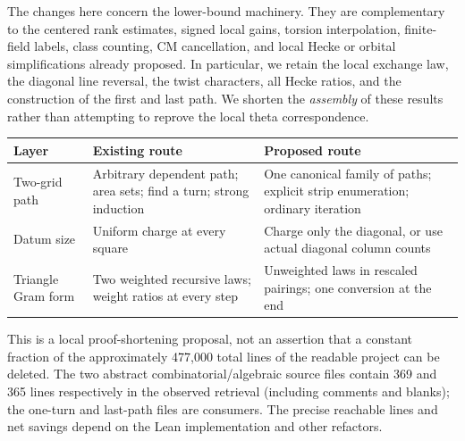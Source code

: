 \documentclass[11pt]{article}
\begin{document}
The changes here concern the lower-bound machinery. They are complementary to the centered rank estimates, signed local gains, torsion interpolation, finite-field labels, class counting, CM cancellation, and local Hecke or orbital simplifications already proposed. In particular, we retain the local exchange law, the diagonal line reversal, the twist characters, all Hecke ratios, and the construction of the first and last path. We shorten the \emph{assembly} of these results rather than attempting to reprove the local theta correspondence.

\begin{center}
\begin{tabular}{p{.25\linewidth}p{.33\linewidth}p{.32\linewidth}}
\toprule
Layer & Existing route & Proposed route\\\midrule
Two-grid path & Arbitrary dependent path; area sets; find a turn; strong induction & One canonical family of paths; explicit strip enumeration; ordinary iteration\\
Datum size & Uniform charge at every square & Charge only the diagonal, or use actual diagonal column counts\\
Triangle Gram form & Two weighted recursive laws; weight ratios at every step & Unweighted laws in rescaled pairings; one conversion at the end\\\bottomrule
\end{tabular}
\end{center}
\noindent This is a local proof-shortening proposal, not an assertion that a constant fraction of the approximately 477,000 total lines of the readable project can be deleted. The two abstract combinatorial/algebraic source files contain 369 and 365 lines respectively in the observed retrieval (including comments and blanks); the one-turn and last-path files are consumers. The precise reachable lines and net savings depend on the Lean implementation and other refactors.
\end{document}
